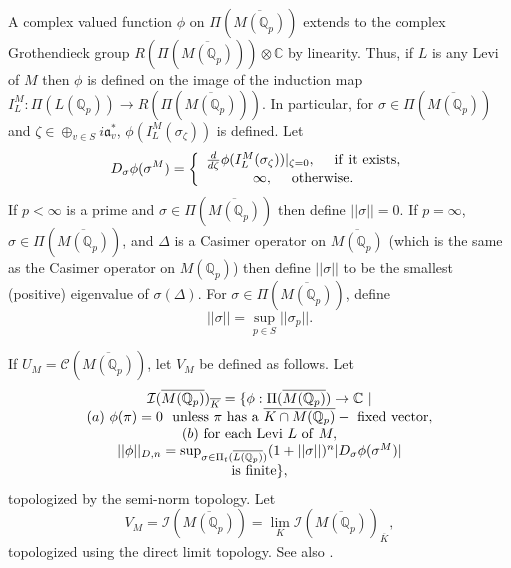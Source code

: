 A complex valued function $\phi$ on
$\Pi(\overline{M({\mathbb{Q}}_p)})$ extends to the
complex Grothendieck group
$R(\Pi(\overline{M({\mathbb{Q}}_p)}))\otimes {\mathbb{C}}$ by linearity.
Thus, if $L$ is any Levi of $M$ then $\phi$ is defined on the image of
the induction map
$I_L^M: \Pi(L({\mathbb{Q}}_p))\rightarrow R(\Pi(\overline{M({\mathbb{Q}}_p)}))$.
In particular, for $\sigma\in \Pi(\overline{M({\mathbb{Q}}_p)})$ and
$\zeta\in \oplus_{v\in S}i{\mathfrak{a}}^*_v$, $\phi(I_L^M(\sigma_\zeta))$ is
defined. Let
\begin{equation}\label{eq:6.10}
D_\sigma \phi(\sigma^M)=
\left\{
\begin{array}{c}
{d\over d\zeta}\phi(I_L^M(\sigma_\zeta))|_{\zeta =0},
\ \ \ \ {\rm if\ it\ exists},\\
\infty,\ \ \ \ {\rm otherwise}.
\end{array}
\right.
\end{equation}
If $p<\infty$ is a prime and
$\sigma\in \Pi(\overline{M({\mathbb{Q}}_p)})$ then define
$||\sigma||=0$. If $p=\infty$,
$\sigma\in \Pi(\overline{M({\mathbb{Q}}_p)})$,
and $\Delta$
is a Casimer operator on $\overline{M({\mathbb{Q}}_p)}$
(which is the same as the Casimer operator on
$M({\mathbb{Q}}_p)$)
then define $||\sigma||$ to be the
smallest (positive) eigenvalue of $\sigma(\Delta)$. For
$\sigma\in \Pi(\overline{M({\mathbb{Q}}_p)})$, define
\[
||\sigma||=\sup_{p\in S}||\sigma_p||.
\]

If $U_M={\mathcal{C}}(\overline{M({\mathbb{Q}}_p)})$, let
$V_M$ be defined as follows.
Let
\[
\begin{array}{c}
{\mathcal{I}}(\overline{M({\mathbb{Q}}_p)})_{\overline{K}}
=\{\phi: \Pi(\overline{M({\mathbb{Q}}_p)})\rightarrow {\mathbb{C}} \ | \\
(a) \ \phi(\pi)=0\ {\rm \ unless\ }\pi{\rm \ has\ a\ }
\overline{K\cap M({\mathbb{Q}}_p)}-{\rm \ fixed\ vector},\\
(b)\ {\rm for \ each\ Levi\ }L{\rm\ of\ }M,\\
||\phi||_{D,n}=\sup_{\sigma\in \Pi_t(\overline{L({\mathbb{Q}}_p)})}
(1+||\sigma||)^n|D_\sigma \phi(\sigma^M)|\\
{\rm is\ finite}\},
\end{array}
\]
topologized by the semi-norm topology. Let
\begin{equation}\label{eq:6.11}
V_M=
{\mathcal{I}}(\overline{M({\mathbb{Q}}_p)})
=\lim_{K}{\mathcal{I}}(\overline{M({\mathbb{Q}}_p)})_{\overline{K}},
\end{equation}
topologized using the direct limit topology.
See also \cite[section 3]{A16}.

